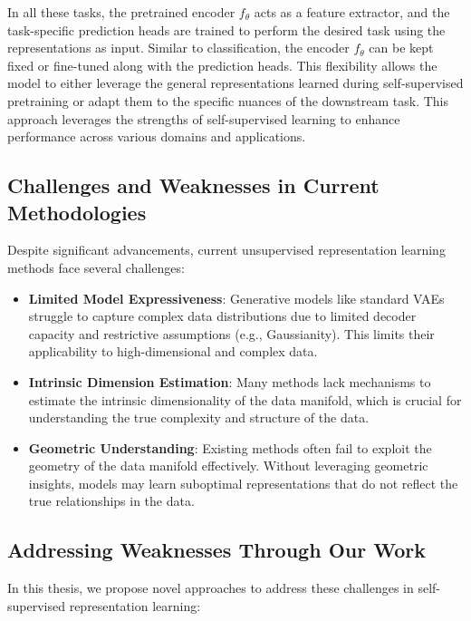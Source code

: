 In all these tasks, the pretrained encoder \( f_{\theta} \) acts as a feature extractor, and the task-specific prediction heads are trained to perform the desired task using the representations as input. Similar to classification, the encoder \( f_{\theta} \) can be kept fixed or fine-tuned along with the prediction heads. This flexibility allows the model to either leverage the general representations learned during self-supervised pretraining or adapt them to the specific nuances of the downstream task. This approach leverages the strengths of self-supervised learning to enhance performance across various domains and applications.

\subsection{Challenges and Weaknesses in Current Methodologies}

Despite significant advancements, current unsupervised representation learning methods face several challenges:

\begin{itemize}
    \item \textbf{Limited Model Expressiveness}: Generative models like standard VAEs struggle to capture complex data distributions due to limited decoder capacity and restrictive assumptions (e.g., Gaussianity). This limits their applicability to high-dimensional and complex data.

    \item \textbf{Intrinsic Dimension Estimation}: Many methods lack mechanisms to estimate the intrinsic dimensionality of the data manifold, which is crucial for understanding the true complexity and structure of the data.

    \item \textbf{Geometric Understanding}: Existing methods often fail to exploit the geometry of the data manifold effectively. Without leveraging geometric insights, models may learn suboptimal representations that do not reflect the true relationships in the data.

\end{itemize}

\subsection{Addressing Weaknesses Through Our Work}

In this thesis, we propose novel approaches to address these challenges in self-supervised representation learning:

